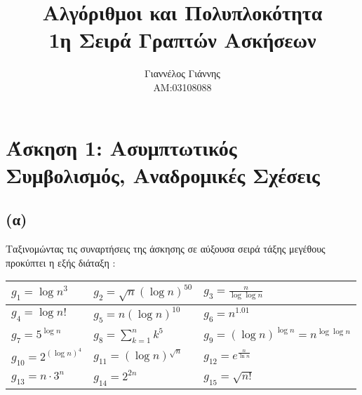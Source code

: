 \documentclass[a4paper,12pt]{report}
\title{ Αλγόριθμοι και Πολυπλοκότητα \\ 1η Σειρά Γραπτών Ασκήσεων}
\author{Γιαννέλος Γιάννης\\ΑΜ:03108088}
\begin{document}
\maketitle

\section*{Άσκηση 1: Ασυμπτωτικός Συμβολισμός, Αναδρομικές Σχέσεις}
\subsection*{(α)}
Ταξινομώντας τις συναρτήσεις της άσκησης σε αύξουσα σειρά τάξης μεγέθους προκύπτει η εξής διάταξη :

\begin{center}
\renewcommand{\arraystretch}{1.5}
\begin{tabular}{ |l|l|l| } 
  \hline
  $g_1=\log n^3$ & $g_2=\sqrt{n} (\log n)^{50}$ & $g_3=\frac{n}{\log \log n}$ \\ \hline
  $g_4=\log n!$ & $g_5=n(\log n)^{10}$ & $g_6=n^{1.01}$ \\ \hline
  $g_7=5^{\log n}$ & $g_8=\sum\limits_{k=1}^{n}{k^5}$ & $g_9=(\log n)^{\log n}=n^{\log \log n}$ \\ \hline
  $g_{10}=2^{(\log n)^4}$ & $g_{11}=(\log n)^{\sqrt n}$ & $g_{12}=e^{\frac{n}{\ln n}}$ \\ \hline 
  $g_{13}=n \cdot 3^n$ & $g_{14}=2^{2n}$ & $g_{15}=\sqrt{n!}$ \\ \hline 
\end{tabular}
\end{center}
\end{document}
